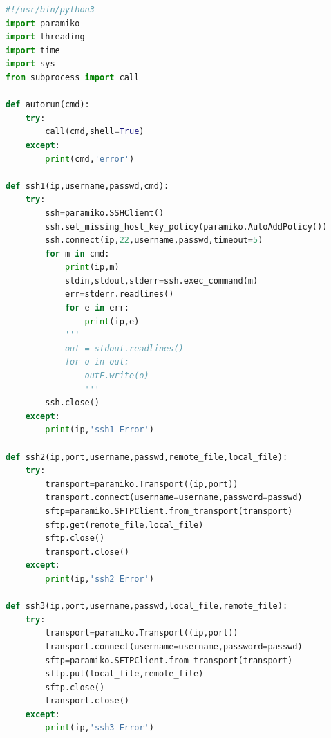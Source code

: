 \documentclass[12pt,a4paper]{article}
\begin{document}
\begin{lstlisting}[language=Python]
#!/usr/bin/python3
import paramiko
import threading
import time
import sys
from subprocess import call

def autorun(cmd):
    try:
        call(cmd,shell=True)
    except:
        print(cmd,'error')

def ssh1(ip,username,passwd,cmd):
    try:
        ssh=paramiko.SSHClient()
        ssh.set_missing_host_key_policy(paramiko.AutoAddPolicy())
        ssh.connect(ip,22,username,passwd,timeout=5)
        for m in cmd:
            print(ip,m)
            stdin,stdout,stderr=ssh.exec_command(m)
            err=stderr.readlines()
            for e in err:
                print(ip,e)
            '''
            out = stdout.readlines()
            for o in out:
                outF.write(o)
                '''
        ssh.close()
    except:
        print(ip,'ssh1 Error')

def ssh2(ip,port,username,passwd,remote_file,local_file):
    try:
        transport=paramiko.Transport((ip,port))
        transport.connect(username=username,password=passwd)
        sftp=paramiko.SFTPClient.from_transport(transport)
        sftp.get(remote_file,local_file)
        sftp.close()
        transport.close()
    except:
        print(ip,'ssh2 Error')

def ssh3(ip,port,username,passwd,local_file,remote_file):
    try:
        transport=paramiko.Transport((ip,port))
        transport.connect(username=username,password=passwd)
        sftp=paramiko.SFTPClient.from_transport(transport)
        sftp.put(local_file,remote_file)
        sftp.close()
        transport.close()
    except:
        print(ip,'ssh3 Error')


\end{lstlisting}
\end{document}
